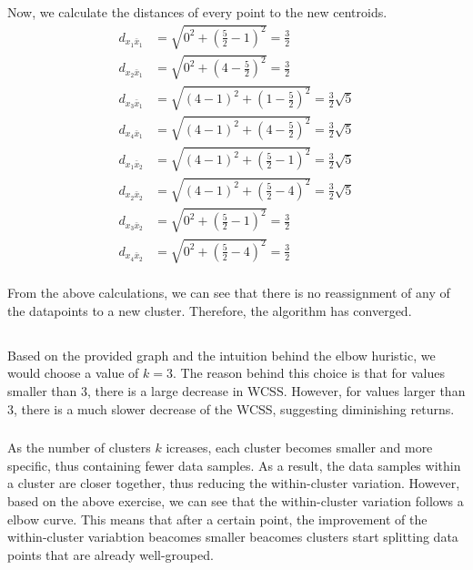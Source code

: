 \documentclass{article}
\begin{document}
Now, we calculate the distances of every point to the new centroids.
\begin{equation}
  \begin{aligned}
    d_{x_1\bar{x}_1} &= \sqrt{0^2 + (\frac{5}{2} - 1)^2} = \frac{3}{2} \\
    d_{x_2\bar{x}_1} &= \sqrt{0^2 + (4 - \frac{5}{2})^2} = \frac{3}{2} \\
    d_{x_3\bar{x}_1} &= \sqrt{(4 - 1)^2 + (1 - \frac{5}{2})^2} = \frac{3}{2}\sqrt{5} \\
    d_{x_4\bar{x}_1} &= \sqrt{(4 - 1)^2 + (4 - \frac{5}{2})^2} = \frac{3}{2}\sqrt{5} \\
    d_{x_1\bar{x}_2} &= \sqrt{(4 - 1)^2 + (\frac{5}{2} - 1)^2} = \frac{3}{2}\sqrt{5} \\
    d_{x_2\bar{x}_2} &= \sqrt{(4 - 1)^2 + (\frac{5}{2} - 4)^2} = \frac{3}{2}\sqrt{5} \\
    d_{x_3\bar{x}_2} &= \sqrt{0^2 + (\frac{5}{2} - 1)^2} = \frac{3}{2} \\
    d_{x_4\bar{x}_2} &= \sqrt{0^2 + (\frac{5}{2} - 4)^2} = \frac{3}{2} \\
  \end{aligned}
\end{equation}

From the above calculations, we can see that there is no reassignment of any of the datapoints to a new cluster. Therefore, the algorithm has converged.

\subsection{}
\subsubsection{}
Based on the provided graph and the intuition behind the elbow huristic, we would choose a value of $k = 3$. The reason behind this choice is that for values smaller than 3, there is a large decrease in WCSS. However, for values larger than 3, there is a much slower decrease of the WCSS, suggesting diminishing returns.

\subsubsection{}  
As the number of clusters $k$ icreases, each cluster becomes smaller and more specific, thus containing fewer data samples. As a result, the data samples within a cluster are closer together, thus reducing the within-cluster variation. However, based on the above exercise, we can see that the within-cluster variation follows a elbow curve. This means that after a certain point, the improvement of the within-cluster variabtion beacomes smaller beacomes clusters start splitting data points that are already well-grouped.
\end{document}
